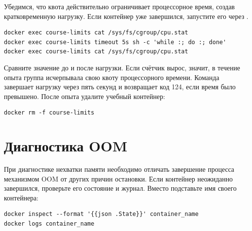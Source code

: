 Убедимся, что квота действительно ограничивает процессорное время, создав кратковременную нагрузку. Если контейнер уже завершился, запустите его через .
\par\addvspace{10pt}\noindent\begin{minipage}{\linewidth}
\begin{verbatim}
docker exec course-limits cat /sys/fs/cgroup/cpu.stat
docker exec course-limits timeout 5s sh -c 'while :; do :; done'
docker exec course-limits cat /sys/fs/cgroup/cpu.stat
\end{verbatim}
\end{minipage}\par\addvspace{10pt}

Сравните значение  до и после нагрузки. Если счётчик вырос, значит, в течение опыта группа исчерпывала свою квоту процессорного времени. Команда  завершает нагрузку через пять секунд и возвращает код 124, если время было превышено. После опыта удалите учебный контейнер:
\par\addvspace{10pt}\noindent\begin{minipage}{\linewidth}
\begin{verbatim}
docker rm -f course-limits
\end{verbatim}
\end{minipage}\par\addvspace{10pt}


\section{Диагностика OOM}

При диагностике нехватки памяти необходимо отличать завершение процесса механизмом OOM от других причин остановки. Если контейнер неожиданно завершился, проверьте его состояние и журнал. Вместо  подставьте имя своего контейнера:
\par\addvspace{10pt}\noindent\begin{minipage}{\linewidth}
\begin{verbatim}
docker inspect --format '{{json .State}}' container_name
docker logs container_name
\end{verbatim}
\end{minipage}\par\addvspace{10pt}

